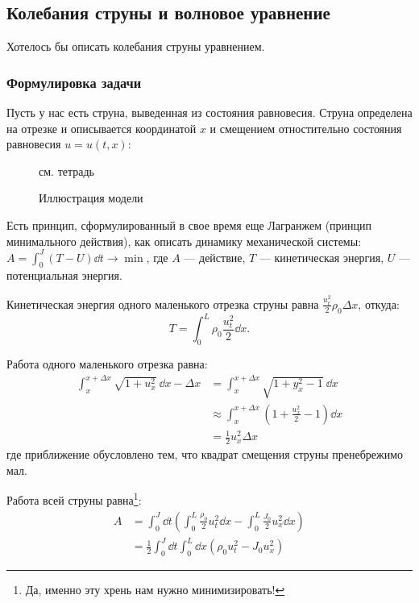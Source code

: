 \subsection{Колебания струны и волновое уравнение}

Хотелось бы описать колебания струны уравнением.

\subsubsection{Формулировка задачи}

Пусть у нас есть струна, выведенная из состояния равновесия. Струна определена на отрезке и описывается координатой $x$ и смещением отностительно состояния равновесия $u = u(t, x)$:
%
\begin{figure}[ht]
  \centering
  {\color{gray} см. тетрадь}
  \caption{Иллюстрация модели}
\end{figure}

Есть принцип, сформулированный в свое время еще Лагранжем (принцип минимального действия), как описать динамику механической системы: $A = \int_0^J (T - U) \dd t \longrightarrow \min$, где $A$ --- действие, $T$ --- кинетическая энергия, $U$ --- потенциальная энергия.

Кинетическая энергия одного маленького отрезка струны равна $\frac{u_t^2}{2} \rho_0 \Delta x$, откуда:
\begin{equation}
  T = \int_0^L \rho_0 \frac{u_t^2}{2} \dd x.
\end{equation}

Работа одного маленького отрезка равна:
%
\begin{equation}
  \begin{aligned}
  \int_x^{x + \Delta x} \sqrt{1 + u_x^2}\ \dd x - \Delta x &= \int_x^{x + \Delta x} \sqrt{1 + y_x^2 - 1}\ \dd x \\
  &\approx \int_x^{x + \Delta x} \left(1 + \frac{u_x^2}{2} - 1\right) \dd x \\
  &= \frac{1}{2} u_x^2 \Delta x
  \end{aligned}
\end{equation}
где приближение обусловлено тем, что квадрат смещения струны пренебрежимо мал.

Работа всей струны равна\footnote{Да, именно эту хрень нам нужно минимизировать!}:
%
\begin{equation}
  \begin{aligned}
    A &= \int_0^J \dd t \left(\int_0^L \frac{\rho_0}{2} u_t^2 \dd x - \int_0^L \frac{J_0}{2} u_x^2 \dd x \right) \\
    &= \frac{1}{2} \int_0^J \dd t \int_0^L \dd x \left(\rho_0 u_t^2 - J_0 u_x^2 \right)
  \end{aligned}
\end{equation}

